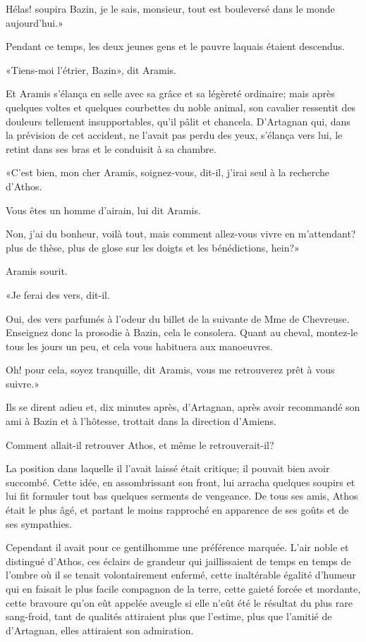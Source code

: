 \speak  Hélas! soupira Bazin, je le sais, monsieur, tout est bouleversé dans le monde aujourd'hui.» 

Pendant ce temps, les deux jeunes gens et le pauvre laquais étaient descendus. 

«Tiens-moi l'étrier, Bazin», dit Aramis. 

Et Aramis s'élança en selle avec sa grâce et sa légèreté ordinaire; mais après quelques voltes et quelques courbettes du noble animal, son cavalier ressentit des douleurs tellement insupportables, qu'il pâlit et chancela. D'Artagnan qui, dans la prévision de cet accident, ne l'avait pas perdu des yeux, s'élança vers lui, le retint dans ses bras et le conduisit à sa chambre. 

«C'est bien, mon cher Aramis, soignez-vous, dit-il, j'irai seul à la recherche d'Athos. 

\speak  Vous êtes un homme d'airain, lui dit Aramis. 

\speak  Non, j'ai du bonheur, voilà tout, mais comment allez-vous vivre en m'attendant? plus de thèse, plus de glose sur les doigts et les bénédictions, hein?» 

Aramis sourit. 

«Je ferai des vers, dit-il. 

\speak  Oui, des vers parfumés à l'odeur du billet de la suivante de Mme de Chevreuse. Enseignez donc la prosodie à Bazin, cela le consolera. Quant au cheval, montez-le tous les jours un peu, et cela vous habituera aux manoeuvres. 

\speak  Oh! pour cela, soyez tranquille, dit Aramis, vous me retrouverez prêt à vous suivre.» 

Ils se dirent adieu et, dix minutes après, d'Artagnan, après avoir recommandé son ami à Bazin et à l'hôtesse, trottait dans la direction d'Amiens. 

Comment allait-il retrouver Athos, et même le retrouverait-il? 

La position dans laquelle il l'avait laissé était critique; il pouvait bien avoir succombé. Cette idée, en assombrissant son front, lui arracha quelques soupirs et lui fit formuler tout bas quelques serments de vengeance. De tous ses amis, Athos était le plus âgé, et partant le moins rapproché en apparence de ses goûts et de ses sympathies. 

Cependant il avait pour ce gentilhomme une préférence marquée. L'air noble et distingué d'Athos, ces éclairs de grandeur qui jaillissaient de temps en temps de l'ombre où il se tenait volontairement enfermé, cette inaltérable égalité d'humeur qui en faisait le plus facile compagnon de la terre, cette gaieté forcée et mordante, cette bravoure qu'on eût appelée aveugle si elle n'eût été le résultat du plus rare sang-froid, tant de qualités attiraient plus que l'estime, plus que l'amitié de d'Artagnan, elles attiraient son admiration. 

